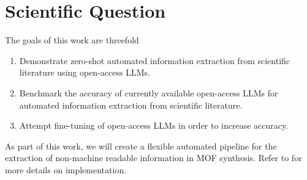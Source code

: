 
\section{Scientific Question}\label{sec:question}

The goals of this work are threefold
\begin{enumerate}
    \item Demonstrate zero-shot automated information extraction from scientific literature using open-access \glspl{LLM}.
    \item Benchmark the accuracy of currently available open-access \glspl{LLM} for automated information extraction from scientific literature.
    \item Attempt fine-tuning of open-access \glspl{LLM} in order to increase accuracy.
\end{enumerate}

As part of this work, we will create a flexible automated pipeline for the extraction of non-machine readable information in \gls{MOF} synthesis.
Refer to  for more details on implementation.
